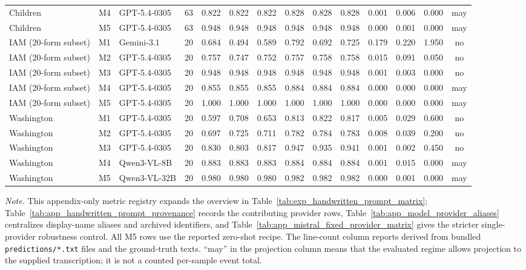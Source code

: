\begin{landscape}
\begin{table}[p]
\begin{tabular}{@{}l l l c c c c c c c c c c c@{}}
    Children & M4 & GPT-5.4-0305 & 63 & 0.822 & 0.822 & 0.822 & 0.828 & 0.828 & 0.828 & 0.001 & 0.006 & 0.000 & may \\
    Children & M5 & GPT-5.4-0305 & 63 & 0.948 & 0.948 & 0.948 & 0.948 & 0.948 & 0.948 & 0.000 & 0.001 & 0.000 & may \\
    IAM (20-form subset) & M1 & Gemini-3.1 & 20 & 0.684 & 0.494 & 0.589 & 0.792 & 0.692 & 0.725 & 0.179 & 0.220 & 1.950 & no \\
    IAM (20-form subset) & M2 & GPT-5.4-0305 & 20 & 0.757 & 0.747 & 0.752 & 0.757 & 0.758 & 0.758 & 0.015 & 0.091 & 0.050 & no \\
    IAM (20-form subset) & M3 & GPT-5.4-0305 & 20 & 0.948 & 0.948 & 0.948 & 0.948 & 0.948 & 0.948 & 0.001 & 0.003 & 0.000 & no \\
    IAM (20-form subset) & M4 & GPT-5.4-0305 & 20 & 0.855 & 0.855 & 0.855 & 0.884 & 0.884 & 0.884 & 0.000 & 0.000 & 0.000 & may \\
    IAM (20-form subset) & M5 & GPT-5.4-0305 & 20 & 1.000 & 1.000 & 1.000 & 1.000 & 1.000 & 1.000 & 0.000 & 0.000 & 0.000 & may \\
    Washington & M1 & GPT-5.4-0305 & 20 & 0.597 & 0.708 & 0.653 & 0.813 & 0.822 & 0.817 & 0.005 & 0.029 & 0.600 & no \\
    Washington & M2 & GPT-5.4-0305 & 20 & 0.697 & 0.725 & 0.711 & 0.782 & 0.784 & 0.783 & 0.008 & 0.039 & 0.200 & no \\
    Washington & M3 & GPT-5.4-0305 & 20 & 0.830 & 0.803 & 0.817 & 0.947 & 0.935 & 0.941 & 0.001 & 0.002 & 0.450 & no \\
    Washington & M4 & Qwen3-VL-8B & 20 & 0.883 & 0.883 & 0.883 & 0.884 & 0.884 & 0.884 & 0.001 & 0.015 & 0.000 & may \\
    Washington & M5 & Qwen3-VL-32B & 20 & 0.980 & 0.980 & 0.980 & 0.982 & 0.982 & 0.982 & 0.000 & 0.001 & 0.000 & may \\
    \bottomrule
  \end{tabular}
  \vspace{0.35em}

  \parbox{0.96\linewidth}{\footnotesize\raggedright \textit{Note.} This appendix-only metric registry expands the overview in Table~\ref{tab:exp_handwritten_prompt_matrix}; Table~\ref{tab:app_handwritten_prompt_provenance} records the contributing provider rows, Table~\ref{tab:app_model_provider_aliases} centralizes display-name aliases and archived identifiers, and Table~\ref{tab:app_mistral_fixed_provider_matrix} gives the stricter single-provider \MistralLargeShort{} robustness control. All M5 rows use the reported zero-shot \contextHundred{} recipe. The line-count column reports \MeanAbsLineDelta{} derived from bundled \texttt{predictions/*.txt} files and the ground-truth texts. ``may'' in the projection column means that the evaluated regime allows projection to the supplied transcription; it is not a counted per-sample event total.}
\end{table}
\end{landscape}
